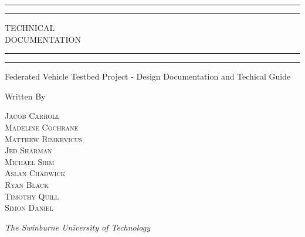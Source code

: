 \documentclass{report}
\author{
	Jacob Carroll \\
	\and
	Madeline Cochrane \\
	\and
	Matthew Rimkevicus \\
	\and
	Jed Sharman \\
	\and
	Michael Shim \\
	\and
	Aslan Chadwick \\
	\and
	Ryan Black \\
	\and
	Timothy Quill \\
	\and
	Simon Daniel
}
\date{\today}
\begin{document}
\begin{titlepage}
  \centering
  \scshape
  \vspace*{\baselineskip}


  \rule{\textwidth}{1.6pt}\vspace*{-\baselineskip}\vspace*{2pt} %
	\rule{\textwidth}{0.4pt} %

	\vspace{0.75\baselineskip} %

	{\LARGE TECHNICAL\\ DOCUMENTATION\\} %

	\vspace{0.75\baselineskip} %

	\rule{\textwidth}{0.4pt}\vspace*{-\baselineskip}\vspace{3.2pt} %
	\rule{\textwidth}{1.6pt} %

	\vspace{2\baselineskip} %


	Federated Vehicle Testbed Project - Design Documentation and Techical Guide %

	\vspace*{3\baselineskip} %


	Written By

	\vspace{0.5\baselineskip} %

	{\scshape\Large
  Jacob Carroll \\
	Madeline Cochrane \\
	Matthew Rimkevicus \\
	Jed Sharman \\
	Michael Shim \\
	Aslan Chadwick \\
	Ryan Black \\
	Timothy Quill \\
	Simon Daniel} %

	\vspace{0.5\baselineskip} %

	\textit{The Swinburne University of Technology} %

	\vfill %

\end{titlepage}
\end{document}
